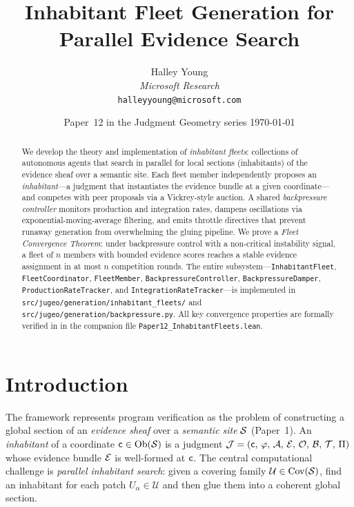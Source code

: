 \documentclass[11pt]{article}
\title{\textbf{Inhabitant Fleet Generation for Parallel Evidence Search}}
\author{%
  Halley Young\\
  \textit{Microsoft Research}\\
  \texttt{halleyyoung@microsoft.com}
}
\date{Paper~12 in the Judgment Geometry series \quad \today}
\providecommand{\FleetPY}{\texttt{InhabitantFleet}}
\providecommand{\CoordPY}{\texttt{FleetCoordinator}}
\providecommand{\MemberPY}{\texttt{FleetMember}}
\providecommand{\BPCtrlPY}{\texttt{BackpressureController}}
\providecommand{\DamperPY}{\texttt{BackpressureDamper}}
\providecommand{\ProdPY}{\texttt{ProductionRateTracker}}
\providecommand{\IntPY}{\texttt{IntegrationRateTracker}}
\begin{document}
\maketitle

\begin{abstract}
We develop the theory and implementation of \emph{inhabitant fleets}: collections
of autonomous agents that search in parallel for local sections (inhabitants)
of the evidence sheaf over a semantic site.  Each fleet member independently
proposes an \emph{inhabitant}---a judgment that instantiates the evidence bundle
at a given coordinate---and competes with peer proposals via a Vickrey-style
auction.  A shared \emph{backpressure controller} monitors production and
integration rates, dampens oscillations via exponential-moving-average
filtering, and emits throttle directives that prevent runaway generation from
overwhelming the gluing pipeline.  We prove a \emph{Fleet Convergence Theorem}:
under backpressure control with a non-critical instability signal, a fleet of
$n$ members with bounded evidence scores reaches a stable evidence assignment
in at most $n$ competition rounds.  The entire subsystem---\FleetPY{},
\CoordPY{}, \MemberPY{}, \BPCtrlPY{}, \DamperPY{}, \ProdPY{}, and
\IntPY{}---is implemented in
\texttt{src/jugeo/generation/inhabitant\_fleets/} and
\texttt{src/jugeo/generation/backpressure.py}.  All key convergence properties
are formally verified in \LEAN{} in the companion file
\texttt{Paper12\_InhabitantFleets.lean}.
\end{abstract}

\newpage

\section{Introduction}\label{sec:intro}

The \JuGeo{} framework represents program verification as the problem of
constructing a global section of an \emph{evidence sheaf} over a
\emph{semantic site} $\mathcal{S}$ (Paper~1).  An \emph{inhabitant} of a coordinate
$\mathsf{c} \in \mathrm{Ob}(\mathcal{S})$ is a judgment $\mathcal{J} = (\mathsf{c},\,\varphi,\,\mathcal{A},\,\mathcal{E},\,\mathcal{O},\,\mathcal{B},\,\mathcal{T},\,\Pi)$
whose evidence bundle $\mathcal{E}$ is well-formed at $\mathsf{c}$.  The central
computational challenge is \emph{parallel inhabitant search}: given a covering
family $\mathcal{U} \in \mathrm{Cov}(\mathcal{S})$, find an inhabitant for each patch
$U_\alpha \in \mathcal{U}$ and then glue them into a coherent global section.
\end{document}
